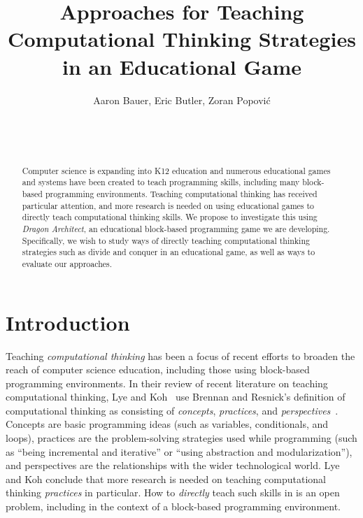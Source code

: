 \documentclass{sig-alternate}
\begin{document}
%

\title{Approaches for Teaching Computational Thinking Strategies in an Educational Game}

\author{
  \alignauthor
  Aaron Bauer, Eric Butler, Zoran Popovi\'c\\
  \\
  \\
  \\
}

\maketitle
\begin{abstract}
Computer science is expanding into K12 education and numerous educational games and systems have been created to teach programming skills, including many block-based programming environments. Teaching computational thinking has received particular attention, and more research is needed on using educational games to directly teach computational thinking skills. We propose to investigate this using \emph{Dragon Architect}, an educational block-based programming game we are developing. Specifically, we wish to study ways of directly teaching computational thinking strategies such as divide and conquer in an educational game, as well as ways to evaluate our approaches. 
\end{abstract}

\section{Introduction}

Teaching \emph{computational thinking} has been a focus of recent efforts to broaden the reach of computer science education, including those using block-based programming environments. 
In their review of recent literature on teaching computational thinking, Lye and Koh~\cite{lye2014review} use Brennan and Resnick's definition of computational thinking as consisting of \emph{concepts}, \emph{practices}, and \emph{perspectives}~\cite{brennan2012new}. 
Concepts are basic programming ideas (such as variables, conditionals, and loops), practices are the problem-solving strategies used while programming (such as ``being incremental and iterative'' or ``using abstraction and modularization''), and perspectives are the relationships with the wider technological world. 
Lye and Koh conclude that more research is needed on teaching computational thinking \emph{practices} in particular. 
How to \emph{directly} teach such skills in is an open problem, including in the context of a block-based programming environment. 
\end{document}

